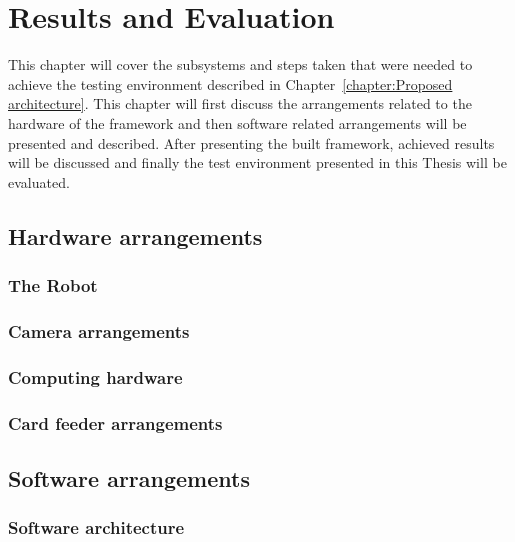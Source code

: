 
\chapter{Results and Evaluation}
\label{chapter:Results and Evaluation}

This chapter will cover the subsystems and steps taken that were needed to achieve the testing environment described in Chapter~\ref{chapter:Proposed architecture}. This chapter will first discuss the arrangements related to the hardware of the framework and then software related arrangements will be presented and described. After presenting the built framework, achieved results will be discussed and finally the test environment presented in this Thesis will be evaluated.

\section{Hardware arrangements}
\label{section:Hardware arrangements}

\subsection{The Robot}
\label{subsection:Robot}

\subsection{Camera arrangements}
\label{subsection:Camera Arrangements}

\subsection{Computing hardware}
\label{subsection:Computing hardware}

\subsection{Card feeder arrangements}
\label{subsection:Card feeder arrangements}

\section{Software arrangements}
\label{section:Software arrangements}

\subsection{Software architecture}
\label{subsection:Software architecture}

